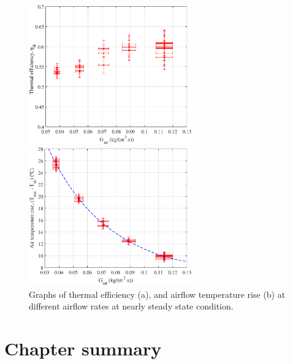 \begin{figure}[ht!]
	\begin{minipage}{0.49\columnwidth}
		\includegraphics[width=0.98\columnwidth,height=6cm]{figs/ef-Gair2.eps}
	\end{minipage}
	\begin{minipage}{0.49\columnwidth}
		\includegraphics[width=0.98\columnwidth,height=6cm]{figs/dT-Gair2.eps}
	\end{minipage}
    \caption{Graphs of thermal efficiency (a), and airflow temperature rise (b) at different airflow rates at nearly steady state condition.}
	\label{ef-Tout-Gair}
\end{figure}







\section{Chapter summary}

